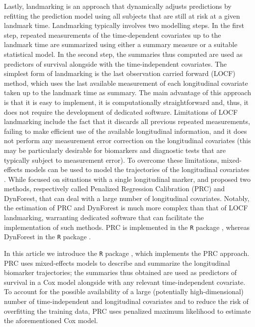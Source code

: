 Lastly, landmarking \citep{vanhouwelingen2007} is an approach that
dynamically adjusts predictions by refitting the prediction model using
all subjects that are still at risk at a given landmark time.
Landmarking typically involves two modelling steps. In the first step,
repeated measurements of the time-dependent covariates up to the
landmark time are summarized using either a summary measure or a
suitable statistical model. In the second step, the summaries thus
computed are used as predictors of survival alongside with the
time-independent covariates. The simplest form of landmarking is the
last observation carried forward (LOCF) method, which uses the last
available measurement of each longitudinal covariate taken up to the
landmark time as summary. The main advantage of this approach is that it
is easy to implement, it is computationally straightforward and, thus,
it does not require the development of dedicated software. Limitations
of LOCF landmarking include the fact that it discards all previous
repeated measurements, failing to make efficient use of the available
longitudinal information, and it does not perform any measurement error
correction on the longitudinal covariates (this may be particularly
desirable for biomarkers and diagnostic tests that are typically subject
to measurement error). To overcome these limitations, mixed-effects
models can be used to model the trajectories of the longitudinal
covariates \citep{signorelli2021, putter2022, devaux2023}. While
\citet{putter2022} focused on situations with a single longitudinal
marker, \citet{signorelli2021} and \citet{devaux2023} proposed two
methods, respectively called Penalized Regression Calibration (PRC) and
DynForest, that can deal with a large number of longitudinal covariates.
Notably, the estimation of PRC and DynForest is much more complex than
that of LOCF landmarking, warranting dedicated software that can
facilitate the implementation of such methods. PRC is implemented in the
\texttt{R} package  \citep{signorelli2023}, whereas
DynForest in the \texttt{R} package 
\citep{devaux2023}.

In this article we introduce the \texttt{R} package ,
which implements the PRC approach. PRC uses mixed-effects models to
describe and summarize the longitudinal biomarker trajectories; the
summaries thus obtained are used as predictors of survival in a Cox
model alongside with any relevant time-independent covariate. To account
for the possible availability of a large (potentially high-dimensional)
number of time-independent and longitudinal covariates and to reduce the
risk of overfitting the training data, PRC uses penalized maximum
likelihood to estimate the aforementioned Cox model.

